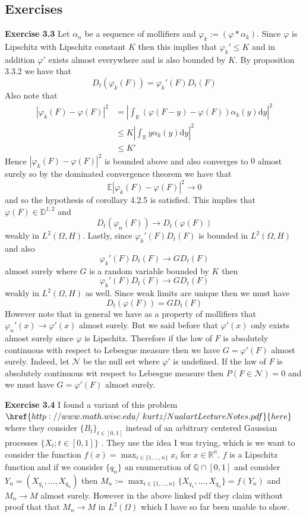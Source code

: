 \documentclass[a4paper,11pt]{article}
\numberwithin{equation}{section}
\theoremstyle{plain}
\theoremstyle{definition}
\newcommand{\ud}{\ensuremath{\mathrm{d}}}
\newcommand{\R}{\mathbb{R}}
\numberwithin{NQ}{section}
\numberwithin{LQ}{section}
\numberwithin{ZQ}{section}
\begin{document}
\subsection{Exercises}

\textbf{Exercise 3.3} Let $\alpha_n$ be a sequence of mollifiers and $\varphi_k := (\varphi * \alpha_k)$. Since $\varphi$ is Lipschitz with Lipschitz constant $K$ then this implies that $\varphi_k ' \le K$ and in addition $\varphi '$ exists almost everywhere and is also bounded by $K$. By proposition 3.3.2 we have that
\[
	D_t(\varphi_k(F))=\varphi_k'(F)D_t(F)
\]
Also note that
\begin{align*}
	|\varphi_k(F)-\varphi(F)|^2 &= \left| \int_\R (\varphi(F-y)-\varphi(F))\alpha_k(y) \ud y \right|^2
	\\ &\le K \left| \int_\R y \alpha_k(y) \ud y \right|^2
	\\ & \le K'
\end{align*}
Hence 	$|\varphi_k(F)-\varphi(F)|^2$ is bounded above and also converges to $0$ almost surely so by the dominated convergence theorem we have that
\[
	\mathbb E |\varphi_k(F)-\varphi(F)|^2 \to 0
\]
and so the hypothesis of corollary 4.2.5 is satisfied. This implies that $\varphi(F) \in \mathbb D^{1,2}$ and
\[
D_t(\varphi_n(F)) \to D_t(\varphi(F))
\]
 weakly in $L^2(\Omega,H)$. Lastly, since $\varphi_k'(F)D_t(F)$ is bounded in $L^2(\Omega,H)$ and also
 \[
 \varphi_k'(F)D_t(F) \to G D_t(F)
 \]
 almost surely where $G$ is a random variable bounded by $K$ then
 \[
 \varphi_k'(F)D_t(F) \to G D_t(F)
 \]
 weakly in $L^2(\Omega,H)$ as well. Since weak limits are unique then we must have
\[
	D_t(\varphi(F)) = G D_t(F)
\]
However note that in general we have as a property of mollifiers that $\varphi_n'(x) \to \varphi'(x)$ almost surely. But we said before that $\varphi'(x)$ only exists almost surely since $\varphi$ is
Lipschitz. Therefore if the law of $F$ is absolutely continuous with respect to Lebesgue measure then we have $G=\varphi '(F)$ almost surely. Indeed, let $\mathcal N$ be the null set where $\varphi'$
is undefined. If the law of $F$ is absolutely continuous wit respect to Lebesgue measure then $P(F \in \mathcal N)=0$ and we must have $G=\varphi '(F)$ almost surely.

\textbf{Exercise 3.4} I found a variant of this problem $\href{http://www.math.wisc.edu/~kurtz/NualartLectureNotes.pdf}{here}$ where they consider $\{B_t\}_{t\in[0,1]}$ instead of an arbitrary centered Gaussian processes $\{X_t; t\in[0,1]\}$ . They use the idea I was trying, which is we want to consider the function $f(x)=\max_{i\in \{1,...,n\}}x_i$ for $x \in \R^n$. $f$ is a Lipschitz function and if we consider $\{q_n\}$ an enumeration of $\mathbb{Q}\cap [0,1]$ and consider $Y_n=(X_{q_1},..., X_{q_n})$ then $M_n:= \max_{i\in \{1,...,n\}}\{X_{q_1},..., X_{q_n}\} = f(Y_n)$ and $M_n \to M$ almost surely. However in the above linked pdf they claim without proof that that $M_n \to M$ in $L^2(\Omega)$ which I have so far been unable to show. 
\end{document}
